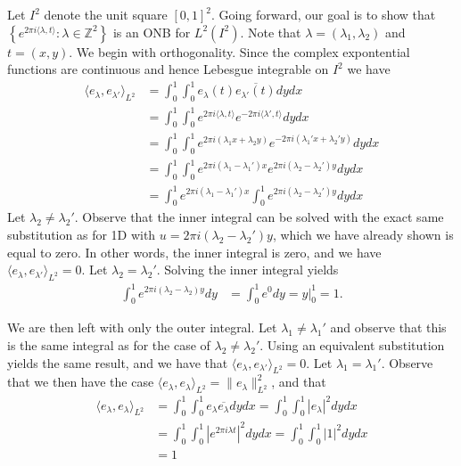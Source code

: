 \documentclass[../thesis.tex]{subfiles}
\begin{document}
Let $I^2$ denote the unit square $[0,1]^2$. Going forward, our goal is to show that $\left\{ e^{2\pi i \langle \lambda,t  \rangle } : \lambda \in \mathbb{Z}^2\right\}$ is an ONB for $L^2{(I^2)}$. Note that $\lambda=(\lambda_1,\lambda_2)$ and $t=(x,y)$. We begin with orthogonality. Since the complex expontential functions are continuous and hence Lebesgue integrable on $I^2$ we have
\begin{align*} 
    \langle e_\lambda,e_{\lambda'} \rangle_{L^2} &= \int_0^1\int_0^1 e_{\lambda}(t) \overline{e_{\lambda'}(t)} dy dx\\ 
    &= \int_0^1\int_0^1 e^{2\pi i \langle \lambda,t\rangle } e^{-2\pi i  \langle \lambda',t\rangle} dy dx\\ 
    &= \int_0^1\int_0^1 e^{2\pi i  (\lambda_1x + \lambda_2 y)} e^{-2\pi i  (\lambda_1' x + \lambda_2' y)} dy dx\\ 
    &= \int_0^1\int_0^1 e^{2\pi i  (\lambda_1- \lambda_1')x} e^{2\pi i  (\lambda_2 - \lambda_2')y} dy dx\\ 
    &= \int_0^1e^{2\pi i  (\lambda_1- \lambda_1')x}\int_0^1  e^{2\pi i  (\lambda_2 - \lambda_2')y} dy dx
\end{align*}
Let $\lambda_2 \neq \lambda_2'$. Observe that the inner integral can be solved with the exact same substitution as for 1D with $u = 2 \pi i (\lambda_2 - \lambda_2')y$, which we have already shown is equal to zero. In other words, the inner integral is zero, and we have $\langle e_\lambda,e_{\lambda'} \rangle_{L^2} = 0$. Let $\lambda_2 = \lambda_2'$. Solving the inner integral yields
\begin{align*}
    \int_0^1  e^{2\pi i  (\lambda_2 - \lambda_2)y} dy&= \int_0^1 e^0 dy = y \big| _0^1 = 1.
\end{align*}

We are then left with only the outer integral. Let $\lambda_1 \neq \lambda_1'$ and observe that this is the same integral as for the case of $\lambda_2 \neq \lambda_2'$. Using an equivalent substitution yields the same result, and we have that $\langle e_\lambda,e_{\lambda'} \rangle_{L^2} = 0$. Let $\lambda_1 = \lambda_1'$. Observe that we then have the case $\langle e_\lambda,e_{\lambda} \rangle_{L^2} = \| e_\lambda \|^2_{L^2}$, and that 
\begin{align*}
    \langle e_\lambda, e_\lambda\rangle_{L^2} &= \int_0^1 \int_0^1 e_\lambda \overline{e_\lambda} dydx = \int_0^1 \int_0^1 |e_\lambda|^2 dydx \\
    &=\int_0^1\int_0^1 |e^{2 \pi i \lambda t}|^2dydx = \int_0^1\int_0^1 |1|^2 dydx  \\
    &= 1
\end{align*}
\end{document}
